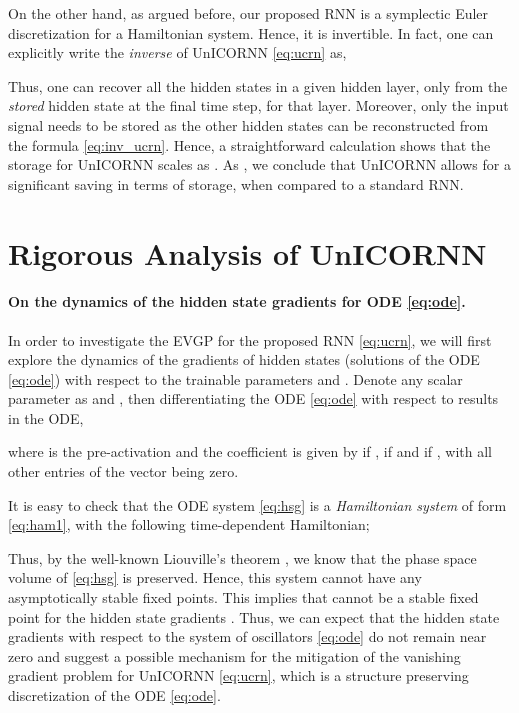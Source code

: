 \documentclass{article}
\begin{document}
On the other hand, as argued before, our proposed RNN is a symplectic Euler discretization for a Hamiltonian system. Hence, it is invertible. In fact, one can explicitly write the \emph{inverse} of UnICORNN \eqref{eq:ucrn} as,

Thus, one can recover all the hidden states in a given hidden layer, only from the \emph{stored} hidden state at the final time step, for that layer. Moreover, only the input signal needs to be stored as the other hidden states can be reconstructed from the formula \eqref{eq:inv_ucrn}. Hence, a straightforward calculation shows that the storage for UnICORNN scales as . As , we conclude that UnICORNN allows for a significant saving in terms of storage, when compared to a standard RNN. 
\section{Rigorous Analysis of UnICORNN}
\paragraph{On the dynamics of the hidden state gradients for ODE \eqref{eq:ode}.}
In order to investigate the EVGP for the proposed RNN \eqref{eq:ucrn}, we will first explore the dynamics of the gradients of hidden states  (solutions of the ODE \eqref{eq:ode}) with respect to the trainable parameters  and . Denote any scalar parameter as  and , then differentiating the ODE \eqref{eq:ode} with respect to  results in the ODE,

where  is the pre-activation and the coefficient  is given by  if ,   if  and  if , with all other entries of the vector  being zero.

It is easy to check that the ODE system \eqref{eq:hsg} is a \emph{Hamiltonian system} of form \eqref{eq:ham1}, with the following time-dependent Hamiltonian;

Thus, by the well-known Liouville's theorem \cite{ss1}, we know that the phase space volume of \eqref{eq:hsg} is preserved. Hence, this system cannot have any asymptotically stable fixed points. This implies that  cannot be a stable fixed point for the hidden state gradients . Thus, we can expect that the hidden state gradients with respect to the system of oscillators \eqref{eq:ode} do not remain near zero and suggest a possible mechanism for the mitigation of the vanishing gradient problem for UnICORNN \eqref{eq:ucrn}, which is a structure preserving discretization of the ODE \eqref{eq:ode}.
\end{document}
